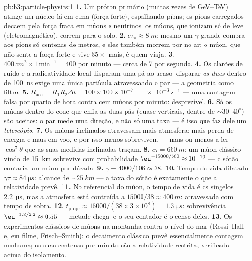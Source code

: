 \begin{solution}{pb:b3:particle-physics:1}
\textbf{1.} Um próton primário (muitas vezes de \unit{GeV}--\unit{TeV})
atinge um núcleo lá em cima (força forte), espalhando píons; os
píons carregados decaem pela força fraca em múons e neutrinos;
os múons, que ionizam só de leve (eletromagnético), correm para o
solo.
\textbf{2.} $c\tau_\pi \approx \qty{8}{m}$: mesmo um $\gamma$ grande
compra aos píons só centenas de metros, e eles também morrem por
 no ar; o múon, que não sente a força forte e
vive $85\times$ mais, é quem viaja.
\textbf{3.} $400\,\unit{cm^2}\times1\,\text{min}^{-1} = 400$
por minuto --- cerca de 7 por segundo.
\textbf{4.} Os clarões de ruído e a radioatividade local disparam uma
pá ao acaso; disparar \emph{as duas} dentro de \qty{100}{ns}
exige uma única partícula atravessando o par --- a geometria como
filtro.
\textbf{5.} $R_{\text{acc}} = R_1R_2\Delta t = 100\times100
\times10^{-7} = \qty{e-3}{s^{-1}}$ --- uma contagem falsa por
quarto de hora contra cem múons por minuto: desprezível.
\textbf{6.} Só os múons dentro do cone que enfia as duas
pás (quase verticais, dentro de ${\sim}30$--$40^\circ$) são
aceitos: o par mede uma direção, e não só uma taxa ---
é isso que faz dele um \emph{telescópio}.
\textbf{7.} Os múons inclinados atravessam mais atmosfera: mais perda de
energia e mais  em voo, e por isso menos sobrevivem ---
mais ou menos a lei $\cos^2\theta$ que as suas medidas inclinadas traçam.
\textbf{8.} $c\tau = \qty{660}{m}$: um múon clássico vindo de
\qty{15}{km} sobrevive com probabilidade
$\eu^{-15000/660} \approx 10^{-10}$ --- o sótão contaria
um múon por década.
\textbf{9.} $\gamma = 4000/106 \approx 38$.
\textbf{10.} Tempo de vida dilatado $\gamma\tau \approx
\qty{84}{\micro s}$: alcance de ${\sim}\qty{25}{km}$ --- a taxa do
sótão é exatamente o que a relatividade prevê.
\textbf{11.} No referencial do múon, o tempo de vida é os singelos
\qty{2.2}{\micro s}, mas a atmosfera está contraída a
$15000/38 \approx \qty{400}{m}$: atravessada com tempo de sobra.
\textbf{12.} $t_{\text{propr}} \approx 15000/(38\times3\times
10^8) = \qty{1.3}{\micro s}$: sobrevivência $\eu^{-1.3/2.2} \approx
0.55$ --- metade chega, e o seu contador é o censo deles.
\textbf{13.} Os experimentos clássicos de múons na montanha contra o
nível do mar (Rossi--Hall e, em filme, Frisch--Smith): o decaimento
clássico prevê essencialmente contagem nenhuma; as suas centenas por
minuto são a relatividade restrita, verificada acima do isolamento.

\end{solution}

